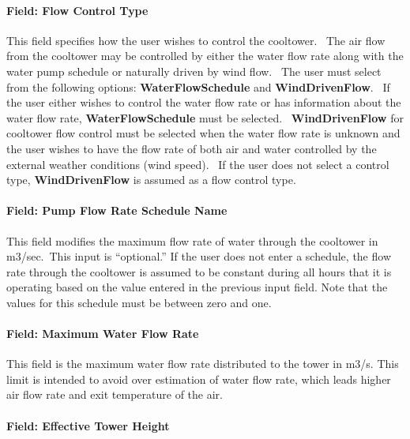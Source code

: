 \paragraph{Field: Flow Control Type}\label{field-flow-control-type}

This field specifies how the user wishes to control the cooltower.~ The air flow from the cooltower may be controlled by either the water flow rate along with the water pump schedule or naturally driven by wind flow.~ The user must select from the following options: \textbf{WaterFlowSchedule} and \textbf{WindDrivenFlow}.~ If the user either wishes to control the water flow rate or has information about the water flow rate, \textbf{WaterFlowSchedule} must be selected.~ \textbf{WindDrivenFlow} for cooltower flow control must be selected when the water flow rate is unknown and the user wishes to have the flow rate of both air and water controlled by the external weather conditions (wind speed).~ If the user does not select a control type, \textbf{WindDrivenFlow} is assumed as a flow control type.

\paragraph{Field: Pump Flow Rate Schedule Name}\label{field-pump-flow-rate-schedule-name}

This field modifies the maximum flow rate of water through the cooltower in m3/sec.~This input is ``optional.'' If the user does not enter a schedule, the flow rate through the cooltower is assumed to be constant during all hours that it is operating based on the value entered in the previous input field. Note that the values for this schedule must be between zero and one.

\paragraph{Field: Maximum Water Flow Rate}\label{field-maximum-water-flow-rate}

This field is the maximum water flow rate distributed to the tower in m3/s. This limit is intended to avoid over estimation of water flow rate, which leads higher air flow rate and exit temperature of the air.

\paragraph{Field: Effective Tower Height}\label{field-effective-tower-height}

